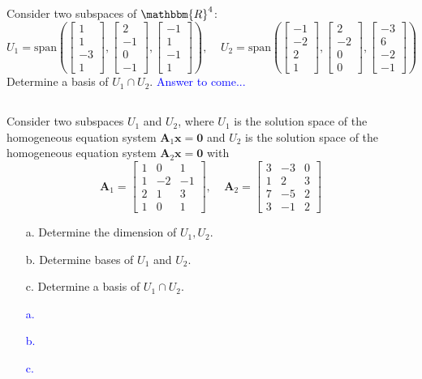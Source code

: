 \documentclass[a4paper,12pt]{article}
\newcommand{\R}{\mathbbm{R}}
\newcommand{\M}[1]{ \begin{bmatrix} #1 \end{bmatrix} }
\newcommand{\vecx}{\textbf{x}}
\newcommand{\veco}{\textbf{0}}
\newcommand{\matA}{\textbf{A}}
\begin{document}
\subsection{}
Consider two subspaces of $\R^4$:
$$
U_1 = \textrm{span}\left( \M{1\\1\\-3\\1}, \M{2\\-1\\0\\-1}, \M{-1\\1\\-1\\1} \right), \;\;\;\;
U_2 = \textrm{span}\left( \M{-1\\-2\\2\\1}, \M{2\\-2\\0\\0}, \M{-3\\6\\-2\\-1} \right)
$$
Determine a basis of $U_1 \cap U_2$.
\textcolor{blue}{
Answer to come...
}
\subsection{}
Consider two subspaces $U_1$ and $U_2$, where $U_1$ is the solution space of the homogeneous equation system $\matA_1 \vecx = \veco$ and $U_2$ is the solution space of the homogeneous equation system $\matA_2 \vecx = \veco$ with
$$\matA_1 = \M{1&0&1\\1&-2&-1\\2&1&3\\1&0&1}, \;\;\;\; \matA_2 = \M{3&-3&0\\1&2&3\\7&-5&2\\3&-1&2}$$
\begin{itemize}
 \item [a.] Determine the dimension of $U_1,U_2$.
 \item [b.] Determine bases of $U_1$ and $U_2$.
 \item [c.] Determine a basis of $U_1 \cap U_2$.
\end{itemize}
\textcolor{blue}{
\begin{itemize}
 \item [a.]
 \item [b.]
 \item [c.]
\end{itemize}
}
\end{document}
